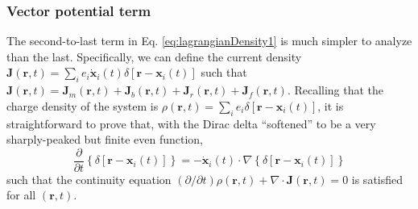 \documentclass{article}
\begin{document}
\subsubsection{Vector potential term}

The second-to-last term in Eq. \eqref{eq:lagrangianDensity1} is much simpler to analyze than the last. Specifically, we can define the current density $\mathbf{J}(\mathbf{r},t) = \sum_ie_i\dot{\mathbf{x}}_i(t)\delta[\mathbf{r} - \mathbf{x}_i(t)]$ such that $\mathbf{J}(\mathbf{r},t) = \mathbf{J}_m(\mathbf{r},t) + \mathbf{J}_b(\mathbf{r},t) + \mathbf{J}_r(\mathbf{r},t) + \mathbf{J}_f(\mathbf{r},t)$. Recalling that the charge density of the system is $\rho(\mathbf{r},t) = \sum_ie_i\delta[\mathbf{r} - \mathbf{x}_i(t)]$, it is straightforward to prove that, with the Dirac delta ``softened'' to be a very sharply-peaked but finite even function,
\begin{equation}
\frac{\partial}{\partial t}\left\{\delta[\mathbf{r} - \mathbf{x}_i(t)]\right\} = -\dot{\mathbf{x}}_i(t)\cdot\nabla\left\{\delta[\mathbf{r} - \mathbf{x}_i(t)]\right\}
\end{equation}
such that the continuity equation $(\partial/\partial t)\rho(\mathbf{r},t) + \nabla\cdot\mathbf{J}(\mathbf{r},t) = 0$ is satisfied for all $(\mathbf{r},t)$.
\end{document}
